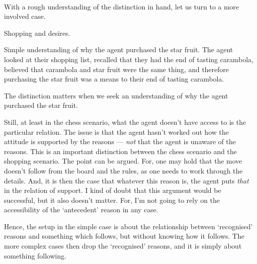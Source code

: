 \documentclass[10pt]{article}
\begin{document}
\paragraph{ }
With a rough understanding of the distinction in hand, let us turn to a more involved case.

Shopping and desires.


Simple understanding of why the agent purchased the star fruit.
The agent looked at their shopping list, recalled that they had the end of tasting carambola, believed that carambola and star fruit were the same thing, and therefore purchasing the star fruit was a means to their end of tasting carambola.



The distinction matters when we seek an understanding of why the agent purchased the star fruit.

\newpage




\begin{note}
  Still, at least in the chess scenario, what the agent doesn't have access to is the particular relation.
  The issue is that the agent hasn't worked out how the attitude is supported by the reasons --- \emph{not} that the agent is unaware of the reasons.
  This is an important distinction between the chess scenario and the shopping scenario.
  The point can be argued.
  For, one may hold that the move doesn't follow from the board and the rules, as one needs to work through the details.
  And, it is then the case that whatever this reason is, the agent puts \emph{that} in the relation of support.
  I kind of doubt that this argument would be successful, but it also doesn't matter.
  For, I'm not going to rely on the accessibility of the `antecedent' reason in any case.

  Hence, the setup in the simple case is about the relationship between `recognised' reasons and something which follows, but without knowing how it follows.
  The more complex cases then drop the `recognised' reasons, and it is simply about something following.
\end{note}
\end{document}
